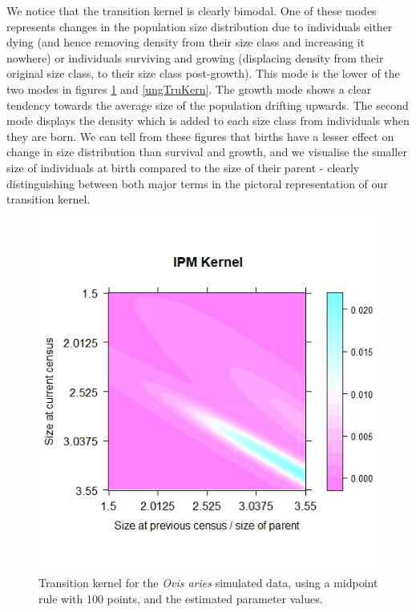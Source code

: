 \documentclass[a4paper,12pt]{article}
\begin{document}
We notice that the transition kernel is clearly bimodal. One of these modes represents changes in the population size distribution due to individuals either dying (and hence removing density from their size class and increasing it nowhere) or individuals surviving and growing (displacing density from their original size class, to their size class post-growth). This mode is the lower of the two modes in figures \ref{ungEstKern} and \ref{ungTruKern}. The growth mode shows a clear tendency towards the average size of the population drifting upwards. The second mode displays the density which is added to each size class from individuals when they are born. We can tell from these figures that births have a lesser effect on change in size distribution than survival and growth, and we visualise the smaller size of individuals at birth compared to the size of their parent -  clearly distinguishing between both major terms in the pictoral representation of our transition kernel.\\

\begin{figure}[H]
\centering
\includegraphics[scale=0.482]{ungulateEstKern.jpg}
\caption{\label{ungEstKern} Transition kernel for the \textit{Ovis aries} simulated data, using a midpoint rule with 100 points, and the estimated parameter values.}
\end{figure}
\end{document}
